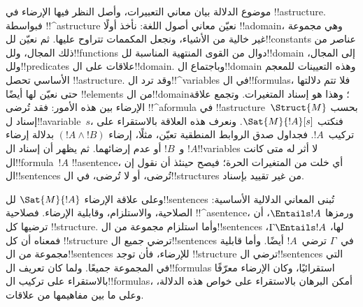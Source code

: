 \documentclass[../../../include/open-logic-section]{subfiles}
\begin{document}


موضوع الدلالة بيان معاني التعبيرات، وأصل النظر فيها الإرضاء في
!!a{structure}. فبواسطة !!^a{structure} نعيّن معاني أصول اللغة:
نأخذ أولًا !!a{domain}، وهي مجموعة غير خالية من الأشياء، ونجعل
المكممات تتراوح عليها. ثم نعيّن لل!!{constant}s عناصر من ذلك
المجال، ولل!!{function}s دوال من القوى المنتهية المناسبة
لل!!{domain} إلى المجال، ولل!!{predicate}s علاقات على
ال!!{domain}. وباجتماع ال!!{domain} وهذه التعيينات للمعجم الأساسي
تحصل !!a{structure}. وقد ترد ال!!^{variable}s في ال!!{formula}s،
فلا تتم دلالتها حتى نعيّن لها أيضًا !!{element}s من
ال!!{domain}؛ وهذا هو إسناد المتغيرات. وتجمع علاقة الإرضاء بين
هذه الأمور: فقد تُرضى !!^a{formula} في
!!a{structure}~$\Struct{M}$ بحسب إسناد ل!!a{variable}~$s$،
فنكتب $\Sat{M}{!A}[s]$. ونعرف هذه العلاقة بالاستقراء على تركيب~$!A$.
فجداول صدق الروابط المنطقية تعيّن، مثلًا، إرضاء $(!A \land !B)$
بدلالة إرضاء $!A$ و~$!B$ أو عدم إرضائهما. ثم يظهر أن إسناد
ال!!{variable}s لا أثر له متى كانت ال!!{formula}~$!A$ !!a{sentence}،
أي خلت من المتغيرات الحرة؛ فيصح حينئذ أن نقول إن
ال!!{sentence}s تُرضى، أو لا تُرضى، في ال!!{structure}s من غير
تقييد بإسناد.

وعلى علاقة الإرضاء $\Sat{M}{!A}$ لل!!{sentence}s تُبنى المعاني
الدلالية الأساسية: الصلاحية، والاستلزام، وقابلية الإرضاء.
فصلاحية !!^a{sentence}، ورمزها $\Entails !A$، أن ترضيها كل
!!{structure}. وأما استلزام مجموعة من ال!!{sentence}s لها،
$\Gamma \Entails !A$، فمعناه أن كل !!{structure} ترضي جميع
ال!!{sentence}s في~$\Gamma$ ترضي~$!A$ أيضًا. وأما قابلية مجموعة من
ال!!{sentence}s للإرضاء، فأن توجد !!{structure} ترضي
ال!!{sentence}s التي في المجموعة جميعًا. ولما كان تعريف
ال!!{formula}s استقرائيًا، وكان الإرضاء معرّفًا بالاستقراء على
تركيب ال!!{formula}s، أمكن البرهان بالاستقراء على خواص هذه الدلالة،
وعلى ما بين مفاهيمها من علاقات.
\end{document}
